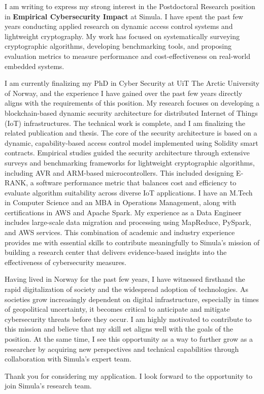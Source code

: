 

I am writing to express my strong interest in the Postdoctoral Research position in \textbf{Empirical Cybersecurity Impact} at Simula. I have spent the past few years conducting applied research on dynamic access control systems and lightweight cryptography. My work has focused on systematically surveying cryptographic algorithms, developing benchmarking tools, and proposing evaluation metrics to measure performance and cost-effectiveness on real-world embedded systems. 

 

I am currently finalizing my PhD in Cyber Security at UiT The Arctic University of Norway, and the experience I have gained over the past few years directly aligns with the requirements of this position. My research focuses on developing a blockchain-based dynamic security architecture for distributed Internet of Things (IoT) infrastructures. The technical work is complete, and I am finalizing the related publication and thesis. The core of the security architecture is based on a dynamic, capability-based access control model implemented using Solidity smart contracts. Empirical studies guided the security architecture through extensive surveys and benchmarking frameworks for lightweight cryptographic algorithms, including AVR and ARM-based microcontrollers. This included designing E-RANK, a software performance metric that balances cost and efficiency to evaluate algorithm suitability across diverse IoT applications. I have an M.Tech in Computer Science and an MBA in Operations Management, along with certifications in AWS and Apache Spark. My experience as a Data Engineer includes large-scale data migration and processing using MapReduce, PySpark, and AWS services. This combination of academic and industry experience provides me with essential skills to contribute meaningfully to Simula’s mission of building a research center that delivers evidence-based insights into the effectiveness of cybersecurity measures.

Having lived in Norway for the past few years, I have witnessed firsthand the rapid digitalization of society and the widespread adoption of technologies. As societies grow increasingly dependent on digital infrastructure, especially in times of geopolitical uncertainty, it becomes critical to anticipate and mitigate cybersecurity threats before they occur. I am highly motivated to contribute to this mission and believe that my skill set aligns well with the goals of the position. At the same time, I see this opportunity as a way to further grow as a researcher by acquiring new perspectives and technical capabilities through collaboration with Simula’s expert team.

Thank you for considering my application. I look forward to the opportunity to join Simula's research team.